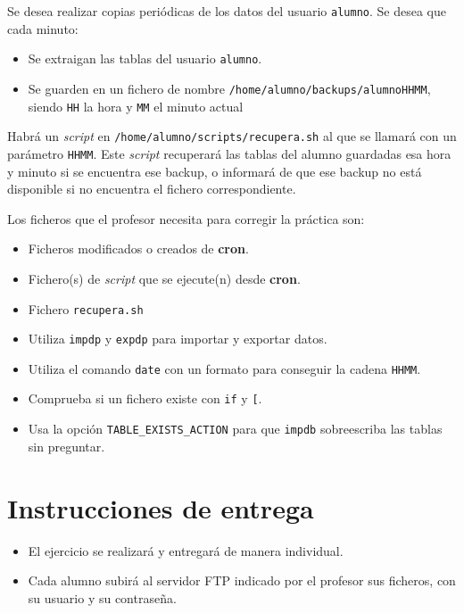 \begin{homeworkProblem}

  Se desea realizar copias periódicas de los datos del usuario \texttt{alumno}. Se desea que cada minuto:
  \begin{itemize}
  \item Se extraigan las tablas del usuario \texttt{alumno}.
  \item Se guarden en un fichero de nombre \texttt{/home/alumno/backups/alumnoHHMM}, siendo \texttt{HH} la hora y \texttt{MM} el minuto actual
  \end{itemize}

  Habrá un \textit{script} en \texttt{/home/alumno/scripts/recupera.sh} al que se llamará con un parámetro \texttt{HHMM}. Este \textit{script} recuperará las tablas del alumno guardadas esa hora y minuto si se encuentra ese backup, o informará de que ese backup no está disponible si no encuentra el fichero correspondiente.

  Los ficheros que el profesor necesita para corregir la práctica son:
  \begin{itemize}
  \item Ficheros modificados o creados de \textbf{cron}.
  \item Fichero(s) de \textit{script} que se ejecute(n) desde \textbf{cron}.
  \item Fichero \texttt{recupera.sh}
  \end{itemize}

  \begin{Aviso}[Ayuda]
    \begin{itemize}
    \item Utiliza \texttt{impdp} y \texttt{expdp} para importar y exportar datos.
    \item Utiliza el comando \texttt{date} con un formato para conseguir la cadena \texttt{HHMM}.
    \item Comprueba si un fichero existe con \texttt{if} y \texttt{[}.
    \item Usa la opción \texttt{TABLE\_EXISTS\_ACTION} para que \texttt{impdb} sobreescriba las tablas sin preguntar.
    \end{itemize}
  \end{Aviso}

\end{homeworkProblem}




\section{Instrucciones de entrega}
\begin{itemize}
\item El ejercicio se realizará y entregará de manera individual.
\item Cada alumno subirá al servidor FTP indicado por el profesor sus ficheros, con su usuario y su contraseña.
\end{itemize}




